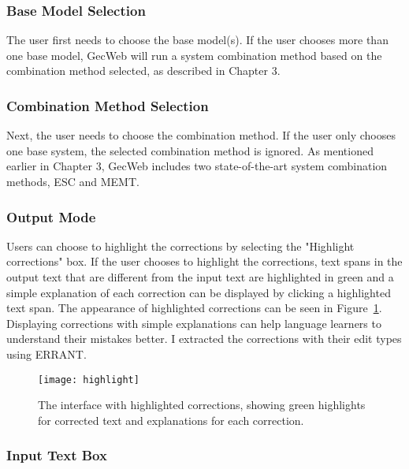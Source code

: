 \subsubsection{Base Model Selection}

The user first needs to choose the base model(s).
If the user chooses more than one base model, GecWeb will run a system combination method based on the combination method selected, as described in Chapter 3.

\subsubsection{Combination Method Selection}

Next, the user needs to choose the combination method.
If the user only chooses one base system, the selected combination method is ignored.
As mentioned earlier in Chapter 3, GecWeb includes two state-of-the-art system combination methods, ESC and MEMT.

\subsubsection{Output Mode}

Users can choose to highlight the corrections by selecting the "Highlight corrections" box.
If the user chooses to highlight the corrections, text spans in the output text that are different from the input text are highlighted in green and a simple explanation of each correction can be displayed by clicking a highlighted text span.
The appearance of highlighted corrections can be seen in Figure~\ref{fig:highlight}.
Displaying corrections with simple explanations can help language learners to understand their mistakes better.
I extracted the corrections with their edit types using ERRANT.

\begin{figure}[htbp]
  \begin{center}
    \texttt{[image: highlight]}
  \end{center}
  \caption{The interface with highlighted corrections, showing green highlights for corrected text and explanations for each correction.}\label{fig:highlight} \end{figure}

\subsubsection{Input Text Box}

